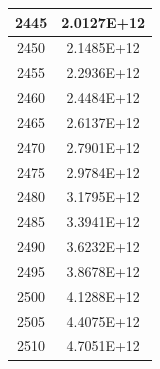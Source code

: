 \documentclass[a4paper]{article}
\begin{document}
\begin{tabular}{|c|c|}
		\hline
		2445 & 2.0127E+12 \\
		\hline
		2450 & 2.1485E+12 \\
		\hline
		2455 & 2.2936E+12 \\
		\hline
		2460 & 2.4484E+12 \\
		\hline
		2465 & 2.6137E+12 \\
		\hline
		2470 & 2.7901E+12 \\
		\hline
		2475 & 2.9784E+12 \\
		\hline
		2480 & 3.1795E+12 \\
		\hline
		2485 & 3.3941E+12 \\
		\hline
		2490 & 3.6232E+12 \\
		\hline
		2495 & 3.8678E+12 \\
		\hline
		2500 & 4.1288E+12 \\
		\hline
		2505 & 4.4075E+12 \\
		\hline
		2510 & 4.7051E+12 \\
		\hline
	\end{tabular}
	\hfill
\end{document}
